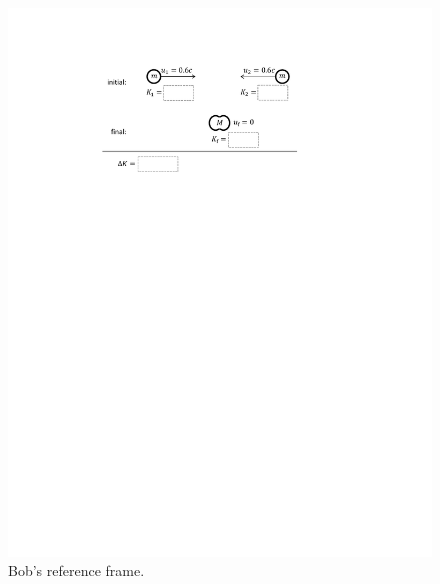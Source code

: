 \begin{figure}[h!]
\begin{center}
\includegraphics{energy_mass/collision_m_and_m.pdf}
\caption{Bob's reference frame.}
\label{figure_collision_m_and_m_bob}
\end{center}
\end{figure}

